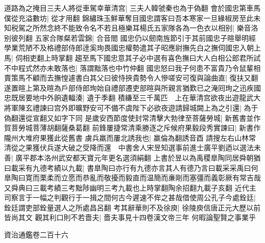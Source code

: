 道路為之掩目三夫人將從車駕幸華清宫|{
	三夫人韓虢秦也為于偽翻}
會於國忠第車馬僕從充溢數坊|{
	從才用翻}
錦繡珠玉鮮華奪目國忠謂客曰吾本寒家一旦緣椒房至此未知税駕之所然念終不能致令名不若且極樂耳楊氏五家隊各為一色衣以相别|{
	樂音洛别彼列翻}
五家合隊粲若雲錦|{
	合音閤}
國忠仍以劒南旌節引于其前國忠子暄舉明經學業荒陋不及格禮部侍郎逹奚珣畏國忠權勢遣其子昭應尉撫先白之撫伺國忠入朝上馬|{
	伺相吏翻上時掌翻}
趨至馬下國忠意其子必中選有喜色撫曰大人白相公郎君所試不中程式然亦未敢落也|{
	落謂黜落也中竹仲翻}
國忠怒曰我子何患不富貴乃令鼠輩相賣策馬不顧而去撫惶遽書白其父曰彼恃挾貴勢令人慘嗟安可復與論曲直|{
	復扶又翻}
遂置暄上第及暄為戶部侍郎珣始自禮部遷吏部暄與所親言猶歎已之淹囘珣之迅疾國忠既居要地中外餉遺輻湊|{
	遺于季翻}
積縑至三千萬匹　上在華清宫欲夜出遊龍武大將軍陳玄禮諫曰宫外即曠野安可不備不虞陛下必欲夜遊請歸城闕上為之引還|{
	為于偽翻還從宣翻又如字下同}
是歲安西節度使封常清擊大勃律至菩薩勞城|{
	新舊書並作賀菩勞城菩薄胡翻薩桑葛翻}
前鋒屢捷常清乘勝逐之斥候府果毅段秀實諫曰|{
	新書作隴州大堆府果獲此從舊書}
虜兵羸而屢北誘我也|{
	羸倫為翻誘音酉}
請搜左右山林常清從之果獲伏兵遂大破之受降而還　中書舍人宋昱知選事前進士廣平劉迺以選法未善|{
	廣平郡本洛州武安都天寶元年更名選須絹翻}
上書於昱以為禹稷臯陶同居舜朝猶曰載采有九德考績以九載|{
	書臯陶曰亦行有九德亦言其人有德乃言曰載采采禹曰何臯陶曰寛而栗柔而立愿而恭亂而敬擾而毅直而温簡而亷剛而塞彊而義彰厥有常吉哉又舜典曰三載考績三考黜陟幽明三考九載也上時掌翻陶余招翻九載子亥翻}
近代主司察言于一幅之判觀行于一揖之間何古今遲速不侔之甚哉借使周公孔子今處銓廷|{
	銓廷謂吏部銓量選人之所處昌呂翻}
考其辭華則不及徐庾|{
	徐陵庾信唐正元大歷以前皆尚其文}
觀其利口則不若嗇夫|{
	嗇夫事見十四卷漢文帝三年}
何暇論聖賢之事業乎

資治通鑑卷二百十六
